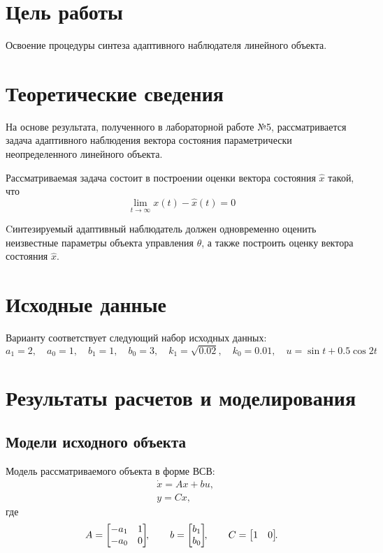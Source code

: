 \section{Цель работы}
Освоение процедуры синтеза адаптивного наблюдателя линейного объекта.


\section{Теоретические сведения}
На основе результата, полученного в лабораторной работе №5, рассматривается задача адаптивного наблюдения вектора состояния параметрически неопределенного линейного объекта.

Рассматриваемая задача состоит в построении оценки вектора состояния $\hat{x}$ такой, что
\begin{equation}\label{goal}
	\lim_{t \to \infty}{x(t) - \hat{x}(t)} = 0
\end{equation}

Cинтезируемый адаптивный наблюдатель должен одновременно оценить неизвестные параметры объекта управления $\theta$, а также построить оценку вектора состояния $\hat{x}$.

\section{Исходные данные}
Варианту  соответствует следующий набор исходных данных:
\begin{equation}
    a_1 = 2,
    \quad
    a_0 = 1,
    \quad
    b_1 = 1,
    \quad
    b_0 = 3,
    \quad
    k_1 = \sqrt{0.02},
    \quad
    k_0 = 0.01,
    \quad
    u = \sin{t} + 0.5 \cos{2t}
\end{equation}


\section{Результаты расчетов и моделирования}
\subsection{Модели исходного объекта}
Модель рассматриваемого объекта в форме ВСВ:
\begin{align}
    & \dot{x} = Ax + bu, \label{eq_state_space_model_of_plant}\\
    & y = Cx,
\end{align}
где
\begin{equation}
    A =
    \begin{bmatrix}
        -a_1 & 1 \\
        -a_0 & 0
    \end{bmatrix}\!\!,
    \qquad
    b = 
    \begin{bmatrix}
        b_1 \\ b_0
    \end{bmatrix}\!\!,
    \qquad
    C =
    \begin{bmatrix}
        1 & 0
    \end{bmatrix}\!\!\ldotp
\end{equation}

